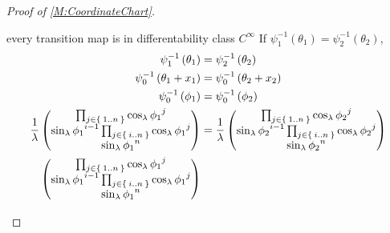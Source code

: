 \documentclass[../methodology.tex]{subfiles}
\begin{document}
\begin{proof}[Proof of \cref{M:CoordinateChart}]
\begin{subproof}{every transition map is in differentability class \(C^\infty\)}
        If \(\psi_1^{-1}\left(\theta_1\right)=\psi_2^{-1}\left(\theta_2\right)\),
        \begin{align*}
            \psi_1^{-1}\left(\theta_1\right)
             & =\psi_2^{-1}\left(\theta_2\right)                                                                               \\
            \psi_0^{-1}\left(\theta_1+x_1\right)
             & =\psi_0^{-1}\left(\theta_2+x_2\right)                                                                           \\
            \psi_0^{-1}\left(\phi_1\right)
             & =\psi_0^{-1}\left(\phi_2\right)                                                                                 \\
            \frac{1}{\lambda}
            \begin{pmatrix}
                \prod_{j\in\Set{1..n}}{\cos_\lambda{\tensor{{\phi_1}}{^j}}}                                        \\
                \sin_\lambda{\tensor{{\phi_1}}{^{i-1}}}\prod_{j\in\Set{i..n}}{\cos_\lambda{\tensor{{\phi_1}}{^j}}} \\
                \sin_\lambda{{\tensor{{\phi_1}}{^n}}}                                                              \\
            \end{pmatrix}
             & =
            \frac{1}{\lambda}
            \begin{pmatrix}
                \prod_{j\in\Set{1..n}}{\cos_\lambda{\tensor{{\phi_2}}{^j}}}                                        \\
                \sin_\lambda{\tensor{{\phi_2}}{^{i-1}}}\prod_{j\in\Set{i..n}}{\cos_\lambda{\tensor{{\phi_2}}{^j}}} \\
                \sin_\lambda{{\tensor{{\phi_2}}{^n}}}                                                              \\
            \end{pmatrix} \\
            \begin{pmatrix}
                \prod_{j\in\Set{1..n}}{\cos_\lambda{\tensor{{\phi_1}}{^j}}}                                        \\
                \sin_\lambda{\tensor{{\phi_1}}{^{i-1}}}\prod_{j\in\Set{i..n}}{\cos_\lambda{\tensor{{\phi_1}}{^j}}} \\
                \sin_\lambda{{\tensor{{\phi_1}}{^n}}}                                                              \\

\end{pmatrix}
\end{align*}
\end{subproof}
\end{proof}
\end{document}
